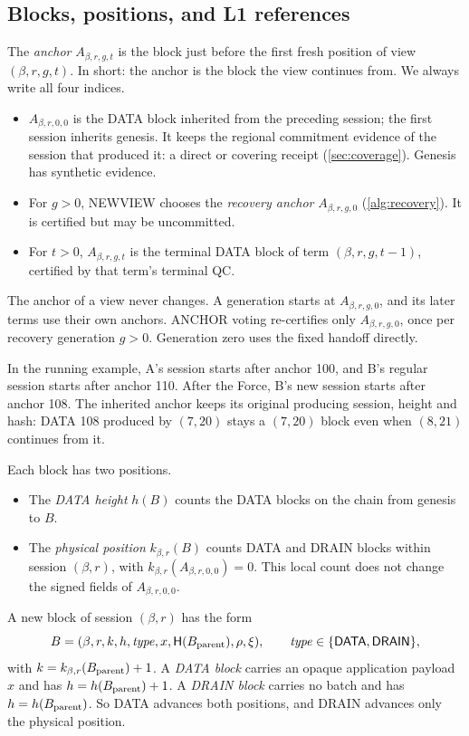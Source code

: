 \documentclass[11pt,a4paper]{article}
\newcommand{\Hash}{\mathsf H}
\newcommand{\tagg}[1]{\ensuremath{\mathsf{#1}}}
\newcommand{\defterm}[1]{\textcolor{rrBlue}{\textit{#1}}}
\begin{document}
\subsection{Blocks, positions, and L1 references}
\label{sec:blocks}
The \defterm{anchor} $A_{\beta,r,g,t}$ is the block just before the first
fresh position of view $(\beta,r,g,t)$. In short: the anchor is the block
the view continues from. We always write all four indices.
\begin{itemize}
\item $A_{\beta,r,0,0}$ is the DATA block inherited from the preceding
session; the first session inherits genesis. It keeps the regional
commitment evidence of the session that produced it: a direct or
covering receipt (\cref{sec:coverage}). Genesis has synthetic evidence.
\item For $g>0$, NEWVIEW chooses the \defterm{recovery anchor}
$A_{\beta,r,g,0}$ (\cref{alg:recovery}). It is certified but may be
uncommitted.
\item For $t>0$, $A_{\beta,r,g,t}$ is the terminal DATA block of term
$(\beta,r,g,t-1)$, certified by that term's terminal QC.
\end{itemize}
The anchor of a view never changes. A generation starts at
$A_{\beta,r,g,0}$, and its later terms use their own anchors. ANCHOR
voting re-certifies only $A_{\beta,r,g,0}$, once per recovery
generation $g>0$. Generation zero uses the fixed handoff directly.

In the running example, A's session starts after anchor 100, and B's
regular session starts after anchor 110. After the Force, B's new session
starts after anchor 108. The inherited anchor keeps its original
producing session, height and hash: DATA 108 produced by $(7,20)$ stays
a $(7,20)$ block even when $(8,21)$ continues from it.

Each block has two positions.
\begin{itemize}
\item The \defterm{DATA height} $h(B)$ counts the DATA blocks on the chain
from genesis to $B$.
\item The \defterm{physical position} $k_{\beta,r}(B)$ counts DATA and DRAIN
blocks within session $(\beta,r)$, with $k_{\beta,r}(A_{\beta,r,0,0})=0$.
This local count does not change the signed fields of $A_{\beta,r,0,0}$.
\end{itemize}
A new block of session $(\beta,r)$ has the form
\[
 B=(\beta,r,k,h,\mathit{type},x,\Hash(B_{\rm parent}),\rho,\xi),
 \qquad \mathit{type}\in\{\tagg{DATA},\tagg{DRAIN}\},
\]
with $k=k_{\beta,r}(B_{\rm parent})+1$. A \defterm{DATA block} carries an opaque application payload
$x$ and has $h=h(B_{\rm parent})+1$. A \defterm{DRAIN
block} carries no batch and has $h=h(B_{\rm parent})$. So DATA advances
both positions, and DRAIN advances only the physical position.
\end{document}
